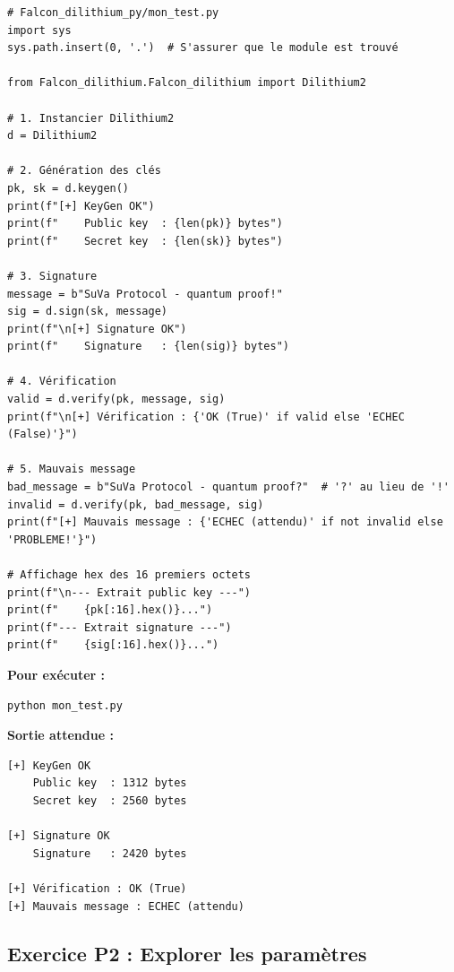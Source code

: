 \documentclass[12pt, a4paper]{article}
\begin{document}
\begin{solution}
\begin{lstlisting}[style=python]
# Falcon_dilithium_py/mon_test.py
import sys
sys.path.insert(0, '.')  # S'assurer que le module est trouvé

from Falcon_dilithium.Falcon_dilithium import Dilithium2

# 1. Instancier Dilithium2
d = Dilithium2

# 2. Génération des clés
pk, sk = d.keygen()
print(f"[+] KeyGen OK")
print(f"    Public key  : {len(pk)} bytes")
print(f"    Secret key  : {len(sk)} bytes")

# 3. Signature
message = b"SuVa Protocol - quantum proof!"
sig = d.sign(sk, message)
print(f"\n[+] Signature OK")
print(f"    Signature   : {len(sig)} bytes")

# 4. Vérification
valid = d.verify(pk, message, sig)
print(f"\n[+] Vérification : {'OK (True)' if valid else 'ECHEC (False)'}")

# 5. Mauvais message
bad_message = b"SuVa Protocol - quantum proof?"  # '?' au lieu de '!'
invalid = d.verify(pk, bad_message, sig)
print(f"[+] Mauvais message : {'ECHEC (attendu)' if not invalid else 'PROBLEME!'}")

# Affichage hex des 16 premiers octets
print(f"\n--- Extrait public key ---")
print(f"    {pk[:16].hex()}...")
print(f"--- Extrait signature ---")
print(f"    {sig[:16].hex()}...")
\end{lstlisting}

\textbf{Pour exécuter :}
\begin{lstlisting}[style=bash]
python mon_test.py
\end{lstlisting}

\textbf{Sortie attendue :}
\begin{lstlisting}[style=output]
[+] KeyGen OK
    Public key  : 1312 bytes
    Secret key  : 2560 bytes

[+] Signature OK
    Signature   : 2420 bytes

[+] Vérification : OK (True)
[+] Mauvais message : ECHEC (attendu)
\end{lstlisting}
\end{solution}

\subsection{Exercice P2 : Explorer les paramètres}
\end{document}
